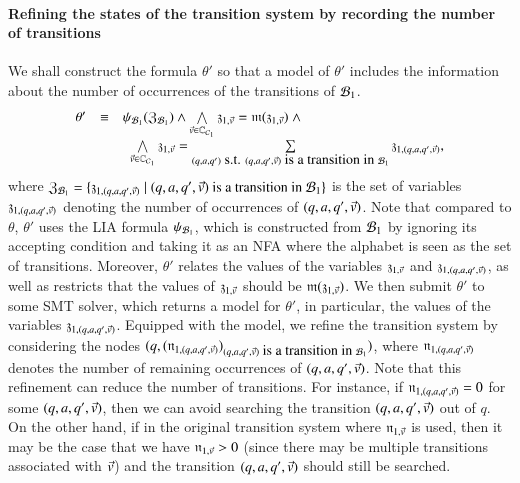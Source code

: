 \paragraph*{Refining the states of the transition system by recording the number of transitions}
We shall construct the formula $\theta'$ so that a model of $\theta'$ includes the information about the number of occurrences of the transitions of $\mathcal{B}_1$.
\[
\begin{array}{l c l}
\theta'  & \equiv &  \psi_{\mathcal{B}_1}(\mathfrak{Z}_{\mathcal{B}_1}) \wedge \bigwedge \limits_{\vec{v} \in \mathbb{C}_{\mathcal{C}_1}} \mathfrak{z}_{1, \vec{v}} = \mathfrak{m}(\mathfrak{z}_{1, \vec{v}}) \ \wedge \\
& & \ \ \bigwedge \limits_{\vec{v} \in \mathbb{C}_{\mathcal{C}_1}} \mathfrak{z}_{1, \vec{v}} = \sum \limits_{(q, a, q') \mbox{ s.t. } (q, a, q', \vec{v}) \mbox{ is a transition in } \mathcal{B}_1} \mathfrak{z}_{1, (q, a, q', \vec{v})},
\end{array}
\]
where $\mathfrak{Z}_{\mathcal{B}_1} = \{\mathfrak{z}_{1, (q, a, q', \vec{v})} \mid (q, a, q', \vec{v}) \mbox{ is a transition in } \mathcal{B}_1\}$ is the set of variables $\mathfrak{z}_{1, (q, a, q', \vec{v})}$ denoting the number of occurrences of $(q, a, q', \vec{v})$. 
Note that compared to $\theta$, $\theta'$ uses the LIA formula $\psi_{\mathcal{B}_1}$, which is constructed from $\mathcal{B}_1$ by ignoring its accepting condition and taking it as an NFA where the alphabet is seen as the set of transitions.  Moreover, $\theta'$ relates the values of the variables $\mathfrak{z}_{1, \vec{v}}$ and $\mathfrak{z}_{1, (q, a, q', \vec{v})}$, as well as restricts that the values of $\mathfrak{z}_{1, \vec{v}}$ should be $\mathfrak{m}(\mathfrak{z}_{1, \vec{v}})$. We then submit $\theta'$ to some SMT solver, which returns a model for $\theta'$, in particular, the values of the variables $\mathfrak{z}_{1, (q, a, q', \vec{v})}$. Equipped with the model, we refine the transition system by considering the nodes $(q, (\mathfrak{n}_{1, (q, a, q', \vec{v})})_{(q, a, q', \vec{v})\mbox{ is a transition in } \mathcal{B}_1})$, where $\mathfrak{n}_{1, (q, a, q', \vec{v})}$ denotes the number of remaining occurrences of $(q, a, q', \vec{v})$. Note that this refinement can reduce the number of transitions. For instance, if $\mathfrak{n}_{1, (q, a, q', \vec{v})} = 0$ for some $(q, a, q', \vec{v})$, then we can avoid searching the transition $(q, a, q', \vec{v})$ out of $q$. On the other hand, if in the original transition system where $\mathfrak{n}_{1, \vec{v}}$ is used, then it may be the case that we have $\mathfrak{n}_{1, \vec{v}} > 0$ (since there may be multiple transitions associated with $\vec{v}$) and the transition $(q, a, q', \vec{v})$ should still be searched. 


